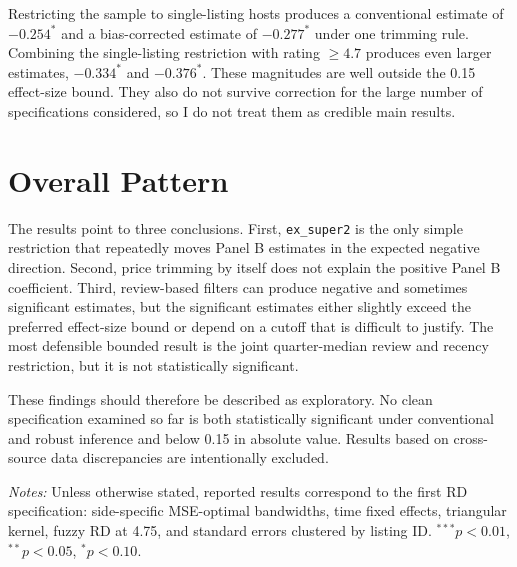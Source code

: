 \documentclass[12pt]{article}
\begin{document}
Restricting the sample to single-listing hosts produces a conventional
estimate of $-0.254^{*}$ and a bias-corrected estimate of $-0.277^{*}$ under
one trimming rule. Combining the single-listing restriction with rating
$\geq 4.7$ produces even larger estimates, $-0.334^{*}$ and $-0.376^{*}$.
These magnitudes are well outside the 0.15 effect-size bound. They also do not
survive correction for the large number of specifications considered, so I do
not treat them as credible main results.


\section{Overall Pattern}

The results point to three conclusions. First, \texttt{ex\_super2} is the only
simple restriction that repeatedly moves Panel B estimates in the expected
negative direction. Second, price trimming by itself does not explain the
positive Panel B coefficient. Third, review-based filters can produce negative
and sometimes significant estimates, but the significant estimates either
slightly exceed the preferred effect-size bound or depend on a cutoff that is
difficult to justify. The most defensible bounded result is the joint
quarter-median review and recency restriction, but it is not statistically
significant.

These findings should therefore be described as exploratory. No clean
specification examined so far is both statistically significant under
conventional and robust inference and below 0.15 in absolute value. Results
based on cross-source data discrepancies are intentionally excluded.

\vspace{0.5em}
\noindent\footnotesize
\textit{Notes:} Unless otherwise stated, reported results correspond to the
first RD specification: side-specific MSE-optimal bandwidths, time fixed
effects, triangular kernel, fuzzy RD at 4.75, and standard errors clustered by
listing ID. $^{***}p<0.01$, $^{**}p<0.05$, $^{*}p<0.10$.
\end{document}
